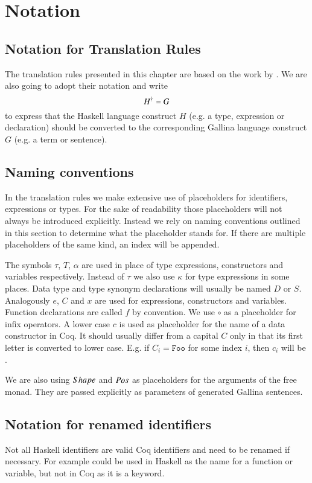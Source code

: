 \section{Notation} \label{sec:translation:notation}
\subsection{Notation for Translation Rules}
The translation rules presented in this chapter are based on the work by \cite{Abel:2005}.
We are also going to adopt their notation and write
\[
  {H}^{\dagger} = G
\]
to express that the Haskell language construct $H$ (e.g. a type, expression or declaration) should be converted to the corresponding Gallina language construct $G$ (e.g. a term or sentence).

\subsection{Naming conventions}
In the translation rules we make extensive use of placeholders for identifiers, expressions or types.
For the sake of readability those placeholders will not always be introduced explicitly.
Instead we rely on naming conventions outlined in this section to determine what the placeholder stands for.
If there are multiple placeholders of the same kind, an index will be appended.

The symbols $\tau$, $T$, $\alpha$ are used in place of type expressions, constructors and variables respectively.
Instead of $\tau$ we also use $\kappa$ for type expressions in some places.
Data type and type synonym declarations will usually be named $D$ or $S$.
Analogously $e$, $C$ and $x$ are used for expressions, constructors and variables.
Function declarations are called $f$ by convention.
We use $\circ$ as a placeholder for infix operators.
A lower case $c$ is used as placeholder for the name of a data constructor in Coq.
It should usually differ from a capital $C$ only in that its first letter is converted to lower case.
E.g. if $C_i = \texttt{Foo}$ for some index $i$, then $c_i$ will be .

We are also using $Shape$ and $Pos$ as placeholders for the arguments of the free monad.
They are passed explicitly as parameters of generated Gallina sentences.

\subsection{Notation for renamed identifiers}
Not all Haskell identifiers are valid Coq identifiers and need to be renamed if necessary.
For example  could be used in Haskell as the name for a function or variable, but not in Coq as it is a keyword.


